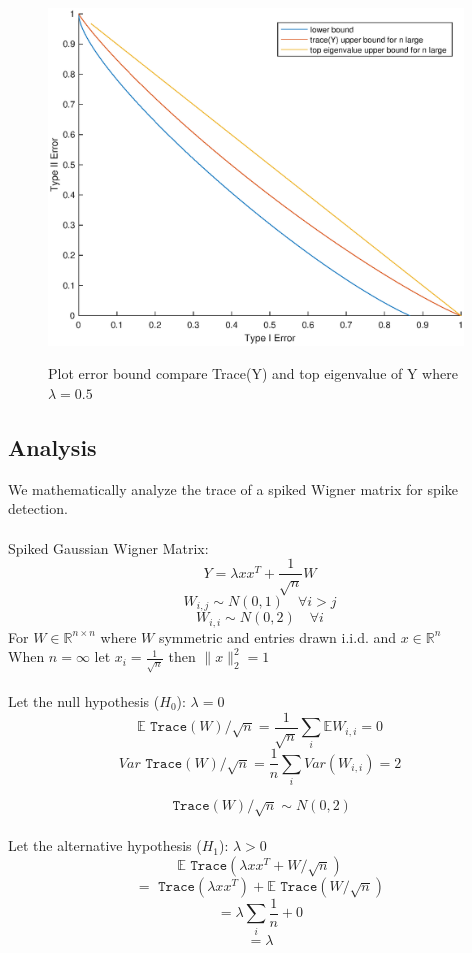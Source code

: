 \documentclass{article}
\begin{document}
\begin{figure}
    \centering
    {\includegraphics[width=11cm]{plot_top_eigY_lambda_50.eps} }
    \caption{ Plot error bound compare Trace(Y) and top eigenvalue of Y where $\lambda = 0.5$}
	\label{fig:plot_top_eigY_lambda_50}
\end{figure}


\subsection*{Analysis}
We mathematically analyze the trace of a spiked Wigner matrix for spike detection.\\
\\
Spiked Gaussian Wigner Matrix: 
$$Y = \lambda x x^T + \frac{1}{\sqrt{n}} W$$
$$W_{i,j} \sim N(0,1) \quad \forall i>j$$
$$W_{i,i} \sim N(0,2) \quad \forall i$$
For $W \in \mathbb{R}^{n \times n}$ where $W$ symmetric and entries drawn i.i.d. and $x \in \mathbb{R}^n$\\
When $n = \infty$ let $x_i = \frac{1}{\sqrt{n}}$ then $\|x\|_2^2 = 1$\\
\\
Let the null hypothesis ($H_0$): $\lambda = 0$
$$ \mathbb{E} \texttt{ Trace}(W)/\sqrt{n} =  \frac {1}{\sqrt{n}} \sum_i \mathbb{E} W_{i,i} = 0$$
$$ Var \texttt{ Trace}(W)/\sqrt{n} =  \frac {1}{n} \sum_i Var (W_{i,i}) = 2$$

$$ \texttt{ Trace}(W)/\sqrt{n} \sim N(0,2) $$
\\
Let the alternative hypothesis ($H_1$): $\lambda > 0$
$$ \mathbb{E} \texttt{ Trace}(\lambda x x^T + W/\sqrt{n})$$
$$= \texttt{ Trace}(\lambda x x^T) + \mathbb{E}\texttt{ Trace}(W/\sqrt{n})$$
$$= \lambda \sum_i \frac 1n + 0$$
$$= \lambda $$
\end{document}
